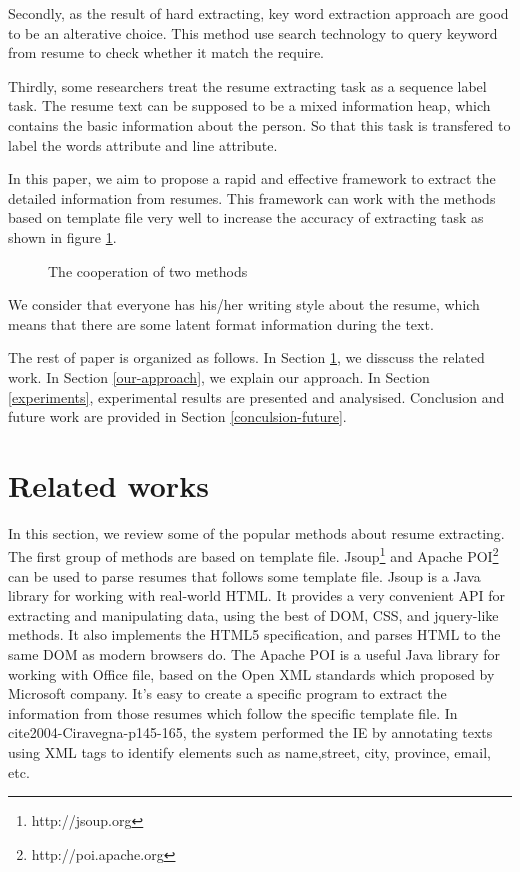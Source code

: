 \documentclass{acm_proc_article-sp}
\begin{document}
Secondly, as the result of hard extracting, key word extraction approach are good to be an alterative choice.
This method use search technology to query keyword from resume to check whether it match the require.

Thirdly, some researchers treat the resume extracting task as a sequence label task.
The resume text can be supposed to be a mixed information heap, which contains the basic information about the person.
So that this task is transfered to label the words attribute and line attribute.

In this paper, we aim to propose a rapid and effective framework to extract the detailed information from resumes. 
This framework can work with the methods based on template file very well to increase the accuracy of extracting task as shown in figure \ref{cooperation}.

\begin{figure}\label{cooperation}
\centering
{}
\caption{The cooperation of two methods}
\end{figure}


We consider that everyone has his/her writing style about the resume, which means that there are some latent format information during the text.

The rest of paper is organized as follows. In Section \ref{related-works}, we disscuss the related work. In Section \ref{our-approach}, we explain our approach. In Section \ref{experiments}, experimental results are presented and analysised. Conclusion and future work are provided in Section \ref{conculsion-future}.

\section{Related works}\label{related-works}

In this section, we review some of the popular methods about resume extracting.
The first group of methods are based  on template file.
Jsoup\footnote{http://jsoup.org} and Apache POI\footnote{http://poi.apache.org} can be used to parse resumes that follows some template file.
Jsoup is a Java library for working with real-world HTML. 
It provides a very convenient API for extracting and manipulating data, using the best of DOM, CSS, and jquery-like methods.
It also implements the HTML5 specification, and parses HTML to the same DOM as modern browsers do.
The Apache POI is a useful Java library for working with Office file, based on the Open XML standards which proposed by Microsoft company.
It's easy to create a specific program to extract the information from those resumes which follow the specific template file.
In cite{2004-Ciravegna-p145-165}, the system performed the IE by annotating texts using XML tags to identify elements such as name,street, city, province, email, etc.
\end{document}
